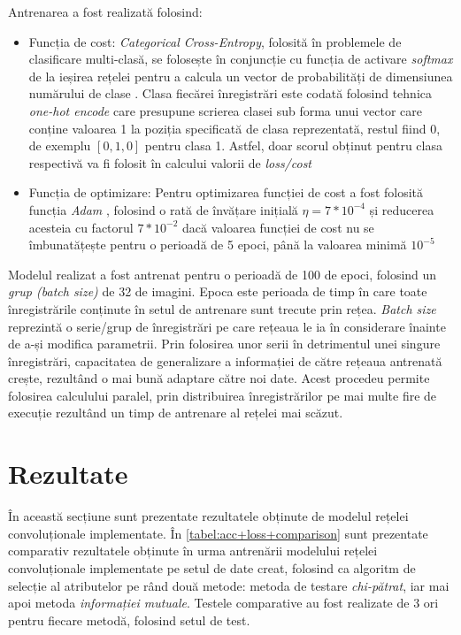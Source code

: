 Antrenarea a fost realizată folosind:
\begin{itemize}
\item Funcția de cost: \textit{Categorical Cross-Entropy}, folosită în problemele de clasificare multi-clasă, se folosește în conjuncție cu funcția de activare \textit{softmax} de la ieșirea rețelei pentru a calcula un vector de probabilități de dimensiunea numărului de clase \cite{online:CCE-loss}. Clasa fiecărei înregistrări este codată folosind tehnica \textit{one-hot encode} care presupune scrierea clasei sub forma unui vector care conține valoarea 1 la poziția specificată de clasa reprezentată, restul fiind 0, de exemplu $[0,1,0]$ pentru clasa 1. Astfel, doar scorul obținut pentru clasa respectivă va fi folosit în calcului valorii de \textit{loss/cost}
\item Funcția de optimizare: Pentru optimizarea funcției de cost a fost folosită funcția \textit{Adam} \cite{kingma2014adam}, folosind o rată de învățare inițială $\eta=7*10^{-4}$ și reducerea acesteia cu factorul $7*10^{-2}$ dacă valoarea funcției de cost nu se îmbunatățește pentru o perioadă de 5 epoci, până la valoarea minimă $10^{-5}$
\end{itemize}

Modelul realizat a fost antrenat pentru o perioadă de 100 de epoci, folosind un \textit{grup (batch size)} de 32 de imagini. Epoca este perioada de timp în care toate înregistrările conținute în setul de antrenare sunt trecute prin rețea. \textit{Batch size} reprezintă o serie/grup de înregistrări pe care rețeaua le ia în considerare înainte de a-și modifica parametrii. Prin folosirea unor serii în detrimentul unei singure înregistrări, capacitatea de generalizare a informației de către rețeaua antrenată crește, rezultând o mai bună adaptare către noi date. Acest procedeu permite folosirea calculului paralel, prin distribuirea înregistrărilor pe mai multe fire de execuție rezultând un timp de antrenare al rețelei mai scăzut. 

\section{Rezultate}
În această secțiune sunt prezentate rezultatele obținute de modelul rețelei convoluționale implementate. În \autoref{tabel:acc+loss+comparison} sunt prezentate comparativ rezultatele obținute în urma antrenării modelului rețelei convoluționale implementate pe setul de date creat, folosind ca algoritm de selecție al atributelor pe rând două metode: metoda de testare \textit{chi-pătrat}, iar mai apoi metoda \textit{informației mutuale}. Testele comparative au fost realizate de 3 ori pentru fiecare metodă, folosind setul de test.

